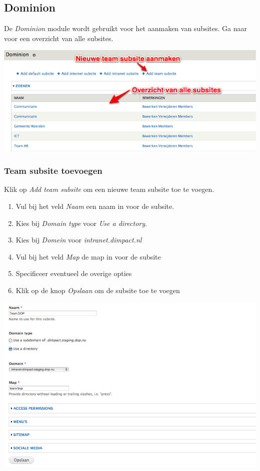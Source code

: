 \subsection{Dominion}\label{dominion}
De \emph{Dominion} module wordt gebruikt voor het aanmaken van subsites. Ga naar  voor een overzicht van alle subsites. 


\bigskip

\begin{center}
	\includegraphics[width=\textwidth]{img/dominion1.png}
\end{center}


\subsubsection{Team subsite toevoegen}\label{teamsubsitetoevoegen}
Klik op \emph{Add team subsite} om een nieuwe team subsite toe te voegen. 

\begin{enumerate}
\item Vul bij het veld \emph{Naam} een naam in voor de subsite.
\item Kies bij \emph{Domain type} voor \emph{Use a directory}.
\item Kies bij \emph{Domein} voor \emph{intranet.dimpact.nl}
\item Vul bij het veld \emph{Map} de map in voor de subsite
\item Specificeer eventueel de overige opties
\item Klik op de knop \emph{Opslaan} om de subsite toe te voegen 
\end{enumerate}

\bigskip

\begin{center}
	\includegraphics[width=\textwidth]{img/dominion2.png}
\end{center}

